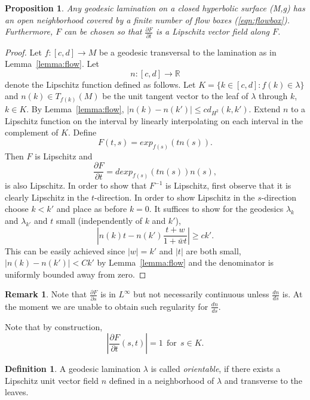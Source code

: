 \documentclass{ip-journal}
\newtheorem{proposition}[theorem]{Proposition}
\theoremstyle{definition}
\newtheorem{definition}[theorem]{Definition}
\newtheorem{remark}[theorem]{Remark}
\numberwithin{equation}{section}
\newcommand{\R}{\mathbb R}
\begin{document}
 \begin{proposition} \label{prop:flow} Any geodesic lamination  on a closed hyperbolic surface (M,g) has an open neighborhood covered by a finite number of flow boxes (\ref{eqn:flowbox}). Furthermore,
   $F$  can be chosen so that  $\frac{\partial F}{\partial t}$  is a Lipschitz vector field along $F$.  \end{proposition}
\begin{proof} Let $f: [c,d] \rightarrow M$ be a geodesic transversal to the lamination as in Lemma~\ref{lemma:flow}. Let
\begin{equation}\label{normal}
n: [c,d] \rightarrow \R
\end{equation}
 denote the Lipschitz function defined as follows. Let $K = \{ k \in [c,d]: f(k) \in \lambda \}$ and $n(k) \in T_{f(k)}(M)$ be the unit tangent vector to the leaf of $\lambda$ through $k$, $k \in K$. By Lemma~\ref{lemma:flow},  $|n(k)- n(k')| \leq cd_{H^2}(k,k')$.  Extend $n$ to a Lipschitz function  on the interval by linearly interpolating on each interval in the complement of $K$. 
Define 
\[
F(t,s) = exp_{f(s)}(t n(s)). 
\]
Then $F$ is Lipschitz and
\[
\frac{\partial F}{\partial t}=dexp_{f(s)}(t n(s))n(s),
\]
is also Lipschitz. In order to show that $F^{-1}$ is Lipschitz, first observe that it is clearly Lipschitz in the $t$-direction. In order to show Lipschitz in the $s$-direction choose $k<k'$ and place as before $k=0$. It suffices to show for the geodesics $\lambda_k$ and $\lambda_{k'}$ and $t$ small (independently of $k$ and $k'$),
\[
\left| n(k)t- n(k')\frac{t +w}{1 + \bar w t} \right| \geq ck'.
\]
This can be easily achieved since $|w|=k'$ and $|t|$ are both small, $|n(k)-n(k')|<Ck'$ by Lemma~\ref{lemma:flow} and the denominator is uniformly bounded away from zero.
 \end{proof}
 
 \begin{remark}\label{nonsmooth}
 Note that $\frac{\partial F}{\partial s}$ is in $L^\infty$ but not necessarily continuous unless $\frac{d n} {ds} $ is. At the moment we are unable to 
 obtain such regularity for $\frac{d n} {ds} $. 
 \end{remark}
 Note that by construction,
 \begin{equation}\label{norone} 
 \left  |\frac{\partial F}{\partial t} (s,t) \right |=1 \ \ \mbox{for} \ \ s \in K.
 \end{equation} 

 
 \begin{definition}\label{orientflow} A geodesic lamination $\lambda$ is called {\it orientable}, if there exists a Lipschitz unit vector field $n$ defined in a neighborhood of $\lambda$ and transverse to the leaves. 
  \end{definition}
 
\end{document}
